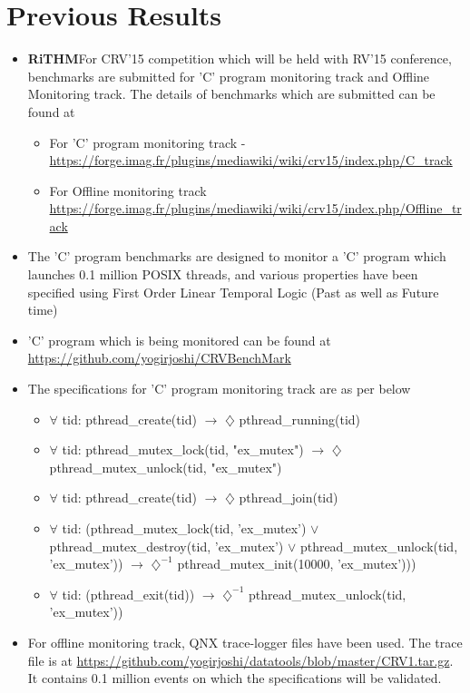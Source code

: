 \documentclass[]{article}
\newcommand{\rithm}{\textbf{RiTHM}\space}
\begin{document}
\section{Previous Results}
\begin{itemize}
\item 
	\rithm For CRV'15 competition which will be held with RV'15 conference, benchmarks are submitted for 'C' program monitoring track and Offline Monitoring track.
	The details of benchmarks which are submitted can be found at 
	\begin{itemize}
		\item For 'C' program monitoring track - \url{https://forge.imag.fr/plugins/mediawiki/wiki/crv15/index.php/C_track}
		\item For Offline monitoring track \url{https://forge.imag.fr/plugins/mediawiki/wiki/crv15/index.php/Offline_track}
	\end{itemize}
	\item The 'C' program benchmarks are designed to monitor a 'C' program which launches 0.1 million POSIX threads, and various properties have been specified using First Order Linear Temporal Logic (Past as well as Future time)
	\item 'C' program which is being monitored can be found at \url{https://github.com/yogirjoshi/CRVBenchMark}
	\item The specifications for 'C' program monitoring track are as per below
	\begin{itemize}
		\item $\forall$ tid: pthread\_create(tid) $\longrightarrow$ $\diamondsuit$ pthread\_running(tid)
		\item $\forall$ tid: pthread\_mutex\_lock(tid, "ex\_mutex") $\longrightarrow$ $\diamondsuit$ pthread\_mutex\_unlock(tid, "ex\_mutex")
		\item $\forall$ tid: pthread\_create(tid) $\longrightarrow$ $\diamondsuit$ pthread\_join(tid)
		\item $\forall$ tid: (pthread\_mutex\_lock(tid, 'ex\_mutex') $\vee$ pthread\_mutex\_destroy(tid, 'ex\_mutex') $\vee$ pthread\_mutex\_unlock(tid, 'ex\_mutex')) $\longrightarrow$ $\diamondsuit^{-1}$ pthread\_mutex\_init(10000, 'ex\_mutex')))
		\item $\forall$ tid: (pthread\_exit(tid)) $\longrightarrow$ $\diamondsuit^{-1}$ pthread\_mutex\_unlock(tid, 'ex\_mutex'))
	\end{itemize}
	\item For offline monitoring track, QNX trace-logger files have been used. The trace file is at \url{https://github.com/yogirjoshi/datatools/blob/master/CRV1.tar.gz}. It contains 0.1 million events on which the specifications will be validated.

\end{itemize}
\end{document}
